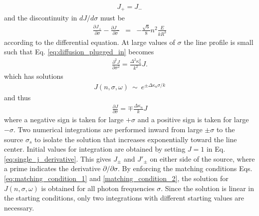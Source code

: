 \documentclass{aastex63}
\newcommand{\be}{\begin{eqnarray}}
\newcommand{\ee}{\end{eqnarray}}
\begin{document}
\be \label{eq:matching_condition_1}
J_+ = J_-
\ee
and the discontinuity in $dJ/d\sigma$  must be
\be \label{matching_condition_2}
\frac{\partial J_+}{\partial \sigma} - \frac{\partial J_-}{\partial \sigma} & = & 
- \frac{\sqrt{6}}{8} n^2 \frac{E}{kR^3}
\ee
according to the differential equation. At large values of $\sigma$ the line profile is small such that Eq. \ref{eq:diffusion_plugged_in} becomes
\be \label{eq:diffusion_at_large_sigma}
\frac{\partial^2J}{\partial\sigma^2} = \frac{\Delta^2\kappa_n^2}{k^2} J.
\ee
which has solutions 
\be
J(n, \sigma, \omega)\ {\sim}\ e^{\pm \Delta \kappa_n \sigma / k}
\ee
and thus
\be \label{eq:single_j_derivative}
\frac{\partial J}{\partial \sigma} = \mp \frac{\Delta\kappa_n}{k} J
\ee
where a negative sign is taken for large $+\sigma$ and a positive sign is taken for large $-\sigma$. Two numerical integrations are performed inward from large $\pm \sigma$ to the source $\sigma_s$ to isolate the solution that increases exponentially toward the line center. Initial values for integration are obtained by setting $J=1$ in Eq. \ref{eq:single_j_derivative}. This gives $J_\pm$ and $J'_\pm$ on either side of the source, where a prime indicates the derivative $\partial/\partial \sigma$. By enforcing the matching conditions Eqs. \ref{eq:matching_condition_1} and \ref{matching_condition_2}, the solution for $J(n, \sigma, \omega)$ is obtained for all photon frequencies $\sigma$. Since the solution is linear in the starting conditions, only two integrations with different starting values are necessary.
\end{document}
